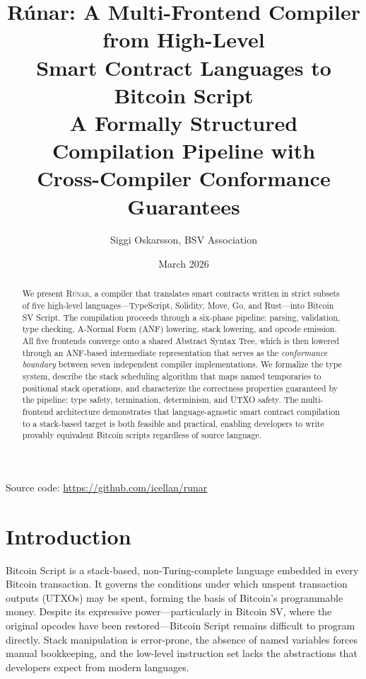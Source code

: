 \documentclass[11pt,a4paper]{article}
\title{%
  \textbf{Rúnar: A Multi-Frontend Compiler from High-Level\\
  Smart Contract Languages to Bitcoin Script}\\[0.5em]
  \large A Formally Structured Compilation Pipeline with\\
  Cross-Compiler Conformance Guarantees
}
\author{Siggi Oskarsson, BSV Association}
\date{March 2026}
\newcommand{\runar}{\textsc{Rúnar}}
\begin{document}
\maketitle

\vspace{-1em}
\begin{center}
\small Source code: \url{https://github.com/icellan/runar}
\end{center}

\begin{abstract}
We present \runar{}, a compiler that translates smart contracts written in
strict subsets of five high-level languages---TypeScript, Solidity, Move, Go,
and Rust---into Bitcoin SV Script. The compilation proceeds through a
six-phase pipeline: parsing, validation, type checking, A-Normal Form (ANF)
lowering, stack lowering, and opcode emission. All five frontends converge
onto a shared Abstract Syntax Tree, which is then lowered through an
ANF-based intermediate representation that serves as the \emph{conformance
boundary} between seven independent compiler implementations. We formalize
the type system, describe the stack scheduling algorithm that maps named
temporaries to positional stack operations, and characterize the correctness
properties guaranteed by the pipeline: type safety, termination, determinism,
and UTXO safety. The multi-frontend architecture demonstrates that
language-agnostic smart contract compilation to a stack-based target is
both feasible and practical, enabling developers to write provably
equivalent Bitcoin scripts regardless of source language.
\end{abstract}

\tableofcontents
\newpage

\section{Introduction}
\label{sec:intro}

Bitcoin Script is a stack-based, non-Turing-complete language embedded in
every Bitcoin transaction. It governs the conditions under which unspent
transaction outputs (UTXOs) may be spent, forming the basis of Bitcoin's
programmable money. Despite its expressive power---particularly in Bitcoin SV,
where the original opcodes have been restored---Bitcoin Script remains
difficult to program directly. Stack manipulation is error-prone, the absence
of named variables forces manual bookkeeping, and the low-level instruction
set lacks the abstractions that developers expect from modern languages.
\end{document}
